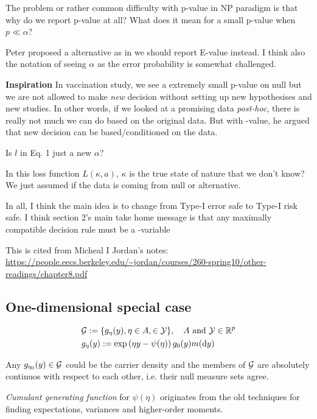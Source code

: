 The problem or rather common difficulty with p-value in NP paradigm is that 
why do we report p-value at all?
What does it mean for a small p-value when $p\ll\alpha$?

Peter proposed a alternative as in we should report E-value instead. 
I think also the notation of seeing $\alpha$ as the error probability is somewhat challenged.

\textbf{Inspiration} \quad In vaccination study, we see a extremely small p-value on null
but we are not allowed to make \emph{new} decision without setting up new hypothesises and 
new studies. In other words, if we looked at a promising data \emph{post-hoc}, 
there is really not much we can do based on the original data. 
But with \E-value, he argued that new decision can be based/conditioned on the data.

Is $l$ in Eq. 1 \cite{grunwaldNeymanPearsonEvalues2024} just a new $\alpha$?

In this loss function $L(\kappa, a)$, $\kappa$ is the true state of nature that we don't know?
We just assumed if the data is coming from null or alternative.

In all, I think the main idea is to change from Type-I error safe to Type-I risk safe.
I think section 2's main take home message is that any maximally compatible decision rule must 
be a \E-variable

This is cited from Micheal I Jordan's notes: 
\url{https://people.eecs.berkeley.edu/~jordan/courses/260-spring10/other-readings/chapter8.pdf}

\subsection{One-dimensional special case}

\begin{align*}
    &\Gc := \{g_{\eta}(y), \eta \in A,  \in \Yc \}, \quad A \text{ and } \Yc \in \Rf^p \\
    &g_{\eta}(y) := \exp\left(\eta y - \psi(\eta)\right) g_0(y) m(\dd{y})
\end{align*}

\begin{remark}
    Any $g_{\eta_0}(y) \in \mathcal{G}$ could be the carrier density and the members of $\mathcal{G}$
    are absolutely continuos with respect to each other, 
    i.e. their null measure sets agree.
\end{remark}

\begin{remark}
    \textit{Cumulant generating function} for $\psi(\eta)$ originates from
    the old techniques for finding expectations, variances and higher-order moments.
\end{remark}

